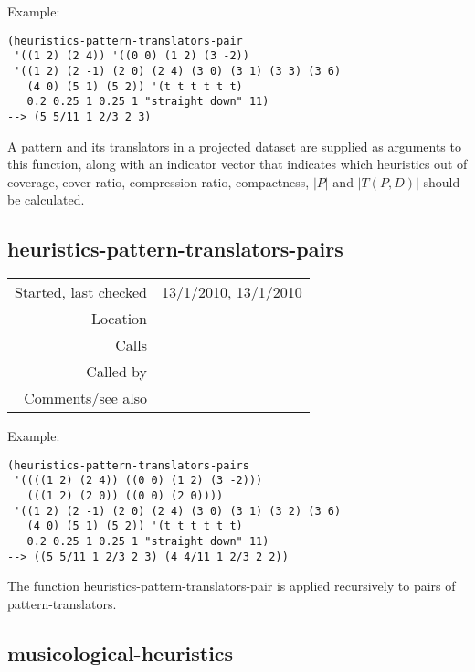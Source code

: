 \vspace{0.5cm}
\noindent Example:
\begin{verbatim}
(heuristics-pattern-translators-pair
 '((1 2) (2 4)) '((0 0) (1 2) (3 -2))
 '((1 2) (2 -1) (2 0) (2 4) (3 0) (3 1) (3 3) (3 6)
   (4 0) (5 1) (5 2)) '(t t t t t t)
   0.2 0.25 1 0.25 1 "straight down" 11)
--> (5 5/11 1 2/3 2 3)
\end{verbatim}

\noindent A pattern and its translators in a projected
dataset are supplied as arguments to this function,
along with an indicator vector that indicates which
heuristics out of coverage, cover ratio, compression
ratio, compactness, $|P|$ and $|T(P, D)|$ should be
calculated.


\subsection*{heuristics-pattern-translators-pairs}\label{fun:heuristics-pattern-translators-pairs}

\vspace{0.3cm}
\begin{tabular}{r|p{8cm}}
Started, last checked & 13/1/2010, 13/1/2010 \\
Location & \nameref{sec:evaluation-heuristics} \\
Calls & \nameref{fun:heuristics-pattern-translators-pair} \\
Called by & \nameref{fun:musicological-heuristics} \\
Comments/see also &
\end{tabular}

\vspace{0.5cm}
\noindent Example:
\begin{verbatim}
(heuristics-pattern-translators-pairs
 '((((1 2) (2 4)) ((0 0) (1 2) (3 -2)))
   (((1 2) (2 0)) ((0 0) (2 0))))
 '((1 2) (2 -1) (2 0) (2 4) (3 0) (3 1) (3 2) (3 6)
   (4 0) (5 1) (5 2)) '(t t t t t t)
   0.2 0.25 1 0.25 1 "straight down" 11)
--> ((5 5/11 1 2/3 2 3) (4 4/11 1 2/3 2 2))

\end{verbatim}

\noindent The function
heuristics-pattern-translators-pair is applied
recursively to pairs of pattern-translators.


\subsection*{musicological-heuristics}\label{fun:musicological-heuristics}

